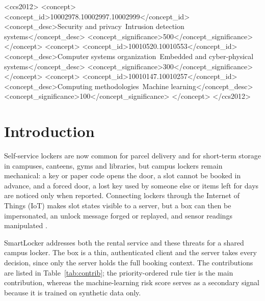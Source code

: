 \documentclass[sigconf,screen]{acmart}
\begin{document}
\begin{CCSXML}
<ccs2012>
 <concept>
  <concept_id>10002978.10002997.10002999</concept_id>
  <concept_desc>Security and privacy~Intrusion detection systems</concept_desc>
  <concept_significance>500</concept_significance>
 </concept>
 <concept>
  <concept_id>10010520.10010553</concept_id>
  <concept_desc>Computer systems organization~Embedded and cyber-physical systems</concept_desc>
  <concept_significance>300</concept_significance>
 </concept>
 <concept>
  <concept_id>10010147.10010257</concept_id>
  <concept_desc>Computing methodologies~Machine learning</concept_desc>
  <concept_significance>100</concept_significance>
 </concept>
</ccs2012>
\end{CCSXML}



\maketitle

\section{Introduction}

Self-service lockers are now common for parcel delivery \cite{iwan2016parcel} and for short-term storage in campuses,
canteens, gyms and libraries, but campus lockers remain mechanical: a key or paper code opens the door, a slot cannot be
booked in advance, and a forced door, a lost key used by someone else or items left for days are noticed only when
reported.
Connecting lockers through the Internet of Things (IoT) \cite{alfuqaha2015iot} makes slot states visible to a server,
but a box can then be impersonated, an unlock message forged or replayed, and sensor readings manipulated
\cite{sicari2015security,roman2013features}.

SmartLocker addresses both the rental service and these threats for a shared campus locker. The box is a thin,
authenticated client and the server takes every decision, since only the server holds the full booking context. The
contributions are listed in Table~\ref{tab:contrib}; the priority-ordered rule tier is the main contribution, whereas
the machine-learning risk score serves as a secondary signal because it is trained on synthetic data only.
\end{document}
